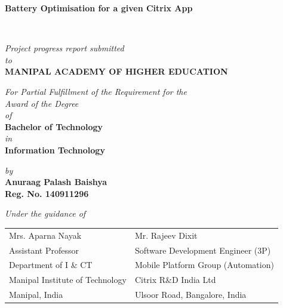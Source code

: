 \documentclass[a4paper,12pt]{article}
\begin{document}
\begin{titlepage}
\vspace*{2cm}
	\begin{center}
	\large{\textbf{Battery Optimisation for a given Citrix App}}
	\end{center}
	\vspace{0.5cm}\
	\begin{center}
	\small{\textit{Project progress report submitted} \\ \vspace{0.25cm} \textit{to} \\ \vspace{0.25cm}\textbf{MANIPAL ACADEMY OF HIGHER EDUCATION} \\}
	\end{center}
	\vspace{0.25cm}
	\begin{center}
	\small{\textit{For Partial Fulfillment of the Requirement for the\\ \vspace{0.25cm}Award of the Degree\\ \vspace{0.25cm}of}} \\ \vspace{0.25cm}
	\textbf{Bachelor of Technology} \\  \vspace{0.25cm} \textit{in} \\ \textbf{Information Technology}
	\end{center}
	
	\begin{center}
	\small{\textit{by}} \\
	\textbf{Anuraag Palash Baishya} \\ \textbf{Reg. No. 140911296} \\
	\end{center}


\begin{center}
	\small{\textit{Under the guidance of}} \\
\renewcommand{\baselinestretch}{1}
{	
\begin{table}[h]
	\centering
		\begin{tabular}{p{3in} p{3in}}
			Mrs. Aparna Nayak &  Mr. Rajeev Dixit  \\
			Assistant Professor
 &    Software Development Engineer (3P) \\
			Department of I \& CT  &  Mobile Platform Group (Automation) \\
			 Manipal Institute of Technology& Citrix R\&D India Ltd \\
			Manipal, India &  Ulsoor Road, Bangalore, India 
		\end{tabular}
\end{table}
}


\end{center}
\end{titlepage}
\end{document}
